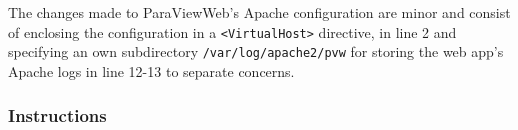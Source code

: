 

The changes made to ParaViewWeb's Apache configuration are minor and consist of
enclosing the configuration in a \texttt{<VirtualHost>} directive,  in line 2
and specifying an own subdirectory \texttt{/var/log/apache2/pvw} for storing the
web app's Apache logs in line 12-13 to separate concerns.



\subsubsection*{Instructions}


